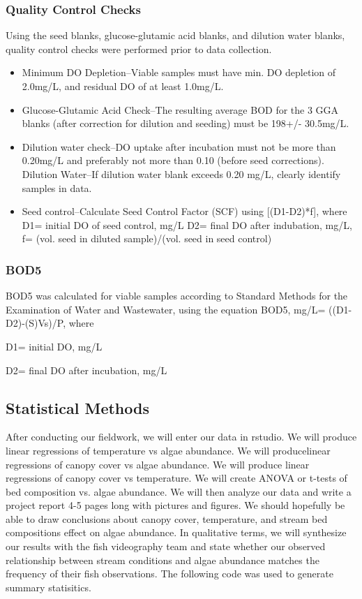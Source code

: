 \documentclass{article}\usepackage[]{graphicx}\usepackage[]{color}
\begin{document}
\subsubsection*{Quality Control Checks}
Using the seed blanks, glucose-glutamic acid blanks, and dilution water blanks, quality control checks were performed prior to data collection. 
\begin{itemize}
  \item Minimum DO Depletion--Viable samples must have min. DO depletion of 2.0mg/L, and residual DO of at least 1.0mg/L.
  \item Glucose-Glutamic Acid Check--The resulting average BOD for the 3 GGA blanks (after correction for dilution and seeding) must be 198+/- 30.5mg/L.
  \item Dilution water check--DO uptake after incubation must not be more than 0.20mg/L and preferably not more than 0.10 (before seed corrections). 
  \subitem Dilution Water--If dilution water blank exceeds 0.20 mg/L, clearly identify samples in data.
  \item Seed control--Calculate Seed Control Factor (SCF) using [(D1-D2)*f], where
  \subitem D1= initial DO of seed control, mg/L
  \subitem D2= final DO after indubation, mg/L,
  \subitem f= (vol. seed in diluted sample)/(vol. seed in seed control)
\end{itemize}

\subsubsection*{BOD5}
BOD5 was calculated for viable samples according to Standard Methods for the Examination of Water and Wastewater, using the equation 
BOD5, mg/L= ((D1-D2)-(S)Vs)/P, where 


D1= initial DO, mg/L

D2= final DO after incubation, mg/L


\subsection{Statistical Methods}

After conducting our ﬁeldwork, we will enter our data in rstudio. We will produce linear regressions of temperature vs algae abundance. We will producelinear regressions of canopy cover vs algae abundance. We will produce linear regressions of canopy cover vs temperature. We will create ANOVA or t-tests of bed composition vs. algae abundance. We will then analyze our data and write a project report 4-5 pages long with pictures and ﬁgures. We should hopefully be able to draw conclusions about canopy cover, temperature, and stream bed compositions eﬀect on algae abundance. In qualitative terms, we will synthesize our results with the ﬁsh videography team and state whether our observed relationship between stream conditions and algae abundance matches the frequency of their ﬁsh observations.
The following code was used to generate summary statisitics. 
\end{document}
